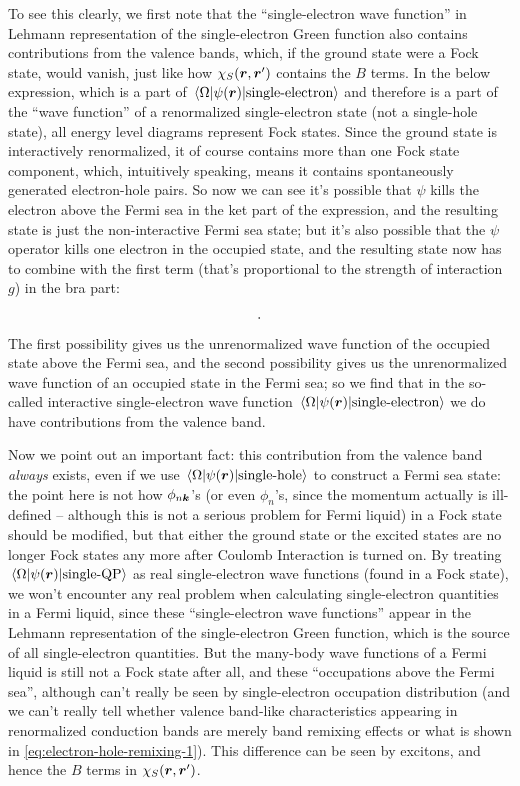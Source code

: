 \documentclass[hyperref, a4paper, 12pt]{report}
\begin{document}
To see this clearly,
we first note that the ``single-electron wave function'' 
in Lehmann representation of the single-electron Green function 
also contains contributions from the valence bands,  
which, if the ground state were a Fock state, 
would vanish, just like how $\chi_{S}(\vb*{r}, \vb*{r}')$ 
contains the $B$ terms.
In the below expression, 
which is a part of $\mel{\Omega}{\psi(\vb*{r})}{\text{single-electron}}$
and therefore is a part of 
the ``wave function'' of a renormalized single-electron state 
(not a single-hole state), 
all energy level diagrams represent Fock states.
Since the ground state is interactively renormalized, 
it of course contains more than one Fock state component, 
which, intuitively speaking, 
means it contains spontaneously generated electron-hole pairs.
So now we can see it's possible that $\psi$ kills 
the electron above the Fermi sea in the ket part of the expression, 
and the resulting state is just the 
non-interactive Fermi sea state; 
but it's also possible that the $\psi$ operator kills one electron 
in the occupied state, 
and the resulting state now has to combine with the 
first term (that's proportional to the strength of interaction $g$) 
in the bra part:
\begin{equation}
    \protect.
    \label{eq:electron-hole-remixing-1}
\end{equation}
The first possibility gives us the unrenormalized wave function 
of the occupied state above the Fermi sea, 
and the second possibility gives us the unrenormalized wave function 
of an occupied state in the Fermi sea; 
so we find that in the so-called interactive single-electron wave function 
$\mel{\Omega}{\psi(\vb*{r})}{\text{single-electron}}$ 
we do have contributions from the valence band. 

Now we point out an important fact: 
this contribution from the valence band 
\emph{always} exists, even if we use 
$\mel{\Omega}{\psi(\vb*{r})}{\text{single-hole}}$ 
to construct a Fermi sea state: 
the point here is not how $\phi_{n \vb*{k}}$'s
(or even $\phi_{n}$'s, since the momentum actually is ill-defined
-- although this is not a serious problem for Fermi liquid)
in a Fock state should be modified, 
but that either the ground state or the excited states 
are no longer Fock states any more 
after Coulomb Interaction is turned on. 
By treating $\mel{\Omega}{\psi(\vb*{r})}{\text{single-QP}}$ 
as real single-electron wave functions 
(found in a Fock state), 
we won't encounter any real problem 
when calculating single-electron quantities 
in a Fermi liquid, 
since these ``single-electron wave functions''
appear in the Lehmann representation of the single-electron Green function,
which is the source of all single-electron quantities.
But the many-body wave functions of a Fermi liquid 
is still not a Fock state after all, 
and these ``occupations above the Fermi sea'', 
although can't really be seen by single-electron occupation distribution 
(and we can't really tell whether valence band-like characteristics 
appearing in renormalized conduction bands 
are merely band remixing effects or what is shown in \eqref{eq:electron-hole-remixing-1}).
This difference can be seen by excitons, 
and hence the $B$ terms in $\chi_S(\vb*{r}, \vb*{r}')$.
\end{document}

